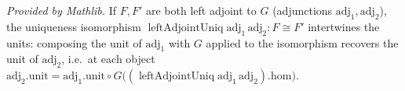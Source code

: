 \begin{lemma}
  \label{lem:unit_leftAdjointUniq_mathlib}
  \mathlibok
  \textit{Provided by Mathlib.}
  If \(F, F'\) are both left adjoint to \(G\) (adjunctions \(\mathrm{adj}_1, \mathrm{adj}_2\)), the
  uniqueness isomorphism \(\operatorname{leftAdjointUniq}\mathrm{adj}_1\,\mathrm{adj}_2 : F \cong F'\)
  intertwines the units: composing the unit of \(\mathrm{adj}_1\) with \(G\) applied to the
  isomorphism recovers the unit of \(\mathrm{adj}_2\), i.e.\ at each object
  \(\mathrm{adj}_2.\mathrm{unit} = \mathrm{adj}_1.\mathrm{unit} \circ G\bigl(
  (\operatorname{leftAdjointUniq}\mathrm{adj}_1\,\mathrm{adj}_2).\mathrm{hom}\bigr)\).
\end{lemma}

